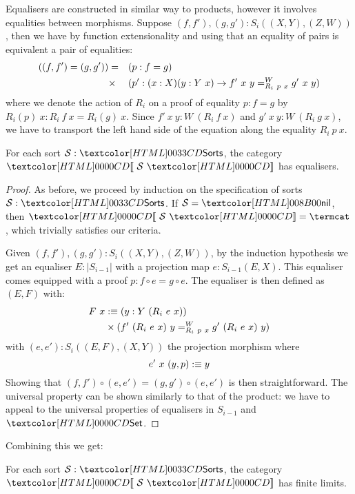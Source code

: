 Equalisers are constructed in similar way to products, however it
involves equalities between morphisms. Suppose
$(f,f'), (g,g') : S_i((X,Y),(Z,W))$, then we have by function
extensionality and using that an equality of pairs is equivalent a
pair of equalities:
% 
\begin{align*}
  ((f,f') = (g,g')) &=& &(p : f = g) \\
                    &\times& &(p' : (x : X) (y : Y\ x) \to \pathover{W}{R_i\ p\ x}{f'\ x\ y}{g'\ x\ y})
\end{align*}
% 
where we denote the action of $R_i$ on a proof of equality $p : f = g$
by $R_i(p)\ x : R_i\ f\ x = R_i(g)\ x$. Since
$f'\ x\ y : W\ (R_i\ f\ x)$ and $g'\ x\ y : W\ (R_i\ g\ x)$, we have
to transport the left hand side of the equation along the equality
$R_i\ p\ x$.

\begin{lemma}
\label{sorts-equalisers}
  For each sort $\Ss : \Sorts$, the category $\SortCat{\Ss}$ has
  equalisers.
\end{lemma}

\begin{proof}
  As before, we proceed by induction on the specification of sorts
  $\Ss : \Sorts$.  If $\Ss = \nil$, then $\SortCat{\Ss} = \termcat$,
  which trivially satisfies our criteria.



  Given $(f,f'), (g,g') : S_i((X,Y),(Z,W))$, by the induction
  hypothesis we get an equaliser $E : |S_{i-1}|$ with a projection map
  $e : S_{i-1}(E,X)$. This equaliser comes equipped with a proof
  $p : f \circ e = g \circ e$. The equaliser is then defined as
  $(E,F)$ with:
  \begin{align*}
    F\ x & \ddefeq (y : Y\ (R_i\ e\ x)) \\
         & \times (\pathover{W}{R_i\ p\ x}{f'\ (R_i\ e\ x)\ y}{g'\ (R_i\ e\ x)\ y})
  \end{align*}
  with $(e,e') : S_i((E,F),(X,Y))$ the projection morphism where
  \[
    e'\ x\ (y , p) \ddefeq y
  \]
  Showing that $(f,f') \circ (e,e') = (g,g') \circ (e,e')$ is then
  straightforward. The universal property can be shown similarly to
  that of the product: we have to appeal to the universal properties
  of equalisers in $S_{i-1}$ and $\Set$.
\end{proof}

Combining this we get:

\begin{theorem}
  For each sort $\Ss : \Sorts$, the category $\SortCat{\Ss}$ has
  finite limits.
\end{theorem}

